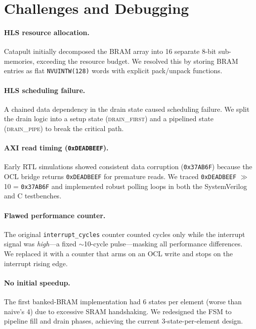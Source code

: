 \documentclass[11pt]{article}
\begin{document}
\section{Challenges and Debugging}

\paragraph{HLS resource allocation.}
Catapult initially decomposed the BRAM array into 16 separate 8-bit sub-memories,
exceeding the resource budget. We resolved this by storing BRAM entries as flat
\texttt{NVUINTW(128)} words with explicit pack/unpack functions.

\paragraph{HLS scheduling failure.}
A chained data dependency in the drain state caused scheduling failure. We split
the drain logic into a setup state (\textsc{drain\_first}) and a pipelined
state (\textsc{drain\_pipe}) to break the critical path.

\paragraph{AXI read timing (\texttt{0xDEADBEEF}).}
Early RTL simulations showed consistent data corruption
(\texttt{0x37AB6F}) because the OCL bridge returns \texttt{0xDEADBEEF} for
premature reads. We traced \texttt{0xDEADBEEF} $\gg$ 10 = \texttt{0x37AB6F}
and implemented robust polling loops in both the SystemVerilog and C testbenches.

\paragraph{Flawed performance counter.}
The original \texttt{interrupt\_cycles} counter counted cycles only while the
interrupt signal was \emph{high}---a fixed $\sim$10-cycle pulse---masking all
performance differences. We replaced it with a counter that arms on an OCL
write and stops on the interrupt rising edge.

\paragraph{No initial speedup.}
The first banked-BRAM implementation had 6 states per element (worse than
naive's 4) due to excessive SRAM handshaking. We redesigned the FSM to pipeline
fill and drain phases, achieving the current 3-state-per-element design.
\end{document}
